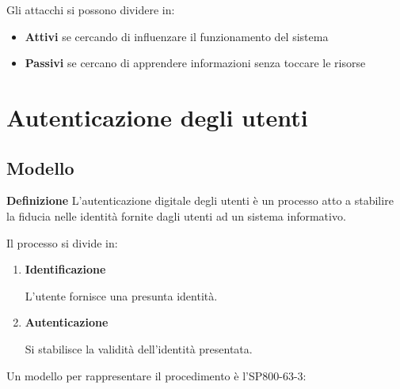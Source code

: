 \documentclass{article}
\newcommand{\df}[1]{\noindent\textbf{Definizione } #1.\newline}
\begin{document}
\noindent Gli attacchi si possono dividere in:
\begin{itemize}
    \item \textbf{Attivi} se cercando di influenzare il funzionamento del sistema
    \item \textbf{Passivi} se cercano di apprendere informazioni senza toccare le risorse\newline
\end{itemize}

\section{Autenticazione degli utenti}

\subsection{Modello}

\df{L'autenticazione digitale degli utenti è un processo atto a stabilire la fiducia nelle identità fornite dagli utenti ad un sistema informativo}

\noindent Il processo si divide in:
\begin{enumerate}
    \item \textbf{Identificazione}

        L'utente fornisce una presunta identità.
    
    \item \textbf{Autenticazione}

        Si stabilisce la validità dell'identità presentata.\newline
    
\end{enumerate}


\noindent Un modello per rappresentare il procedimento è l'SP800-63-3:
\end{document}
